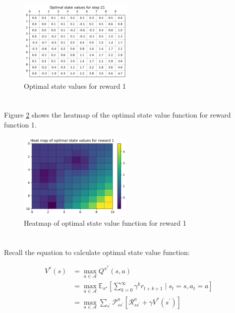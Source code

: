 \begin{figure}[!htb]
  \includegraphics[width=0.49\textwidth]{images/Q1-9/Optimal-state-values-for-step-21.png}
  \caption{Optimal state values for reward 1}
\label{fig: matrix1}
\end{figure}

\section{}\label{sec:3}
Figure \ref{fig: heatmap2} shows the heatmap of the optimal state value function for reward function 1.

\begin{figure}[!htb]
\centering
  \includegraphics[width=0.49\textwidth]{images/Q1-9/Heat-map-of-optimal-state-values-for-reward-1.png}
  \caption{Heatmap of optimal state value function for reward 1}
\label{fig: heatmap2}
\end{figure}

\section{}\label{sec:4}
Recall the equation to calculate optimal state value function:  

\begin{equation}
\label{eq: optimal-value}
     \begin{aligned} 
         V^{*}(s) 
         &=\max _{a \in \mathcal{A}} Q^{\pi^{*}}(s, a) \\ 
         &=\max _{a \in \mathcal{A}} \mathbb{E}_{\pi^{*}}\left[\sum_{k=0}^{\infty} \gamma^{k} r_{t+k+1} \mid s_{t}=s, a_{t}=a\right] \\
         &=\max _{a \in \mathcal{A}} \sum_{s^{\prime}} \mathcal{P}_{s s^{\prime}}^{a}\left[\mathcal{R}_{s s^{\prime}}^{a}+\gamma V^{*}\left(s^{\prime}\right)\right] \end{aligned}
\end{equation}

